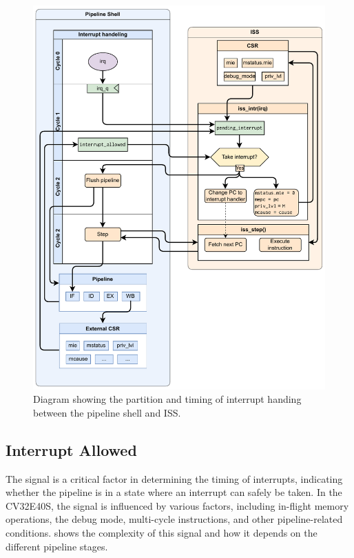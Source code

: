 \begin{figure}
    \centering
    \includegraphics[width=1\linewidth]{figures/PS_interrupt_timing.pdf}
    \caption{Diagram showing the partition and timing of interrupt handing between the pipeline shell and ISS.}
    \label{fig:ps_interrupt_timing}
\end{figure}


\subsection{Interrupt Allowed}
\label{sec:interrupt_allowed}


The  signal is a critical factor in determining the timing of interrupts, indicating whether the pipeline is in a state where an interrupt can safely be taken. In the CV32E40S, the signal is influenced by various factors, including in-flight memory operations, the debug mode, multi-cycle instructions, and other pipeline-related conditions.  shows the complexity of this signal and how it depends on the different pipeline stages.

